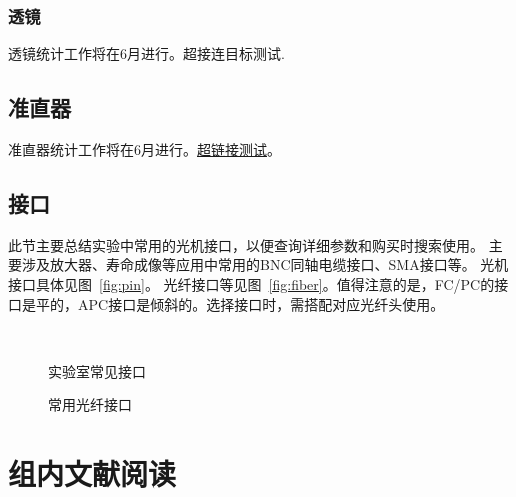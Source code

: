 \documentclass[cn,11pt,chinese]{elegantbook}
\begin{document}
\subsection{透镜}
透镜统计工作将在6月进行。\hypertarget{fig1}{超接连目标测试}.
\section{准直器}
准直器统计工作将在6月进行。\hyperlink{fig1}{超链接测试}。

\section{接口}
此节主要总结实验中常用的光机接口，以便查询详细参数和购买时搜索使用。
主要涉及放大器、寿命成像等应用中常用的BNC同轴电缆接口、SMA接口等。
光机接口具体见图~\vref{fig:pin}。
光纤接口等见图~\vref{fig:fiber}。值得注意的是，FC/PC的接口是平的，APC接口是倾斜的。选择接口时，需搭配对应光纤头使用。
\begin{figure}[ht]
	\centering
	 \quad
	 \quad
	 \quad
	 \\
	\caption{实验室常见接口} 
	\label{fig:pin}
\end{figure}

\begin{figure}[ht]
	\centering
	 \quad
	  \quad
	\caption{常用光纤接口} 
	\label{fig:fiber}
\end{figure}

\chapter{组内文献阅读}
\end{document}

